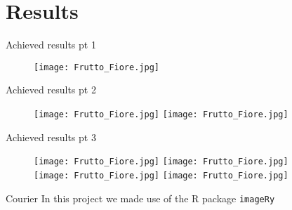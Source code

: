 \documentclass{beamer} %
\begin{document}
\section{Results}
\begin{frame}{Achieved results pt 1}
\begin{figure}
    \centering
    \texttt{[image: Frutto\_Fiore.jpg]} %
\end{figure}
    
\end{frame}

\begin{frame}{Achieved results pt 2}
\begin{figure}
    \centering
    \texttt{[image: Frutto\_Fiore.jpg]} 
    \pause \texttt{[image: Frutto\_Fiore.jpg]} %
\end{figure}
    
\end{frame}

\begin{frame}{Achieved results pt 3}
\begin{figure}
    \centering
    \texttt{[image: Frutto\_Fiore.jpg]} 
    \texttt{[image: Frutto\_Fiore.jpg]} \\
    \texttt{[image: Frutto\_Fiore.jpg]} 
    \texttt{[image: Frutto\_Fiore.jpg]} 
\end{figure}
    
\end{frame}

\begin{frame}{Courier}
    In this project we made use of the R package 
    \texttt{imageRy} %
\end{frame}
\end{document}
